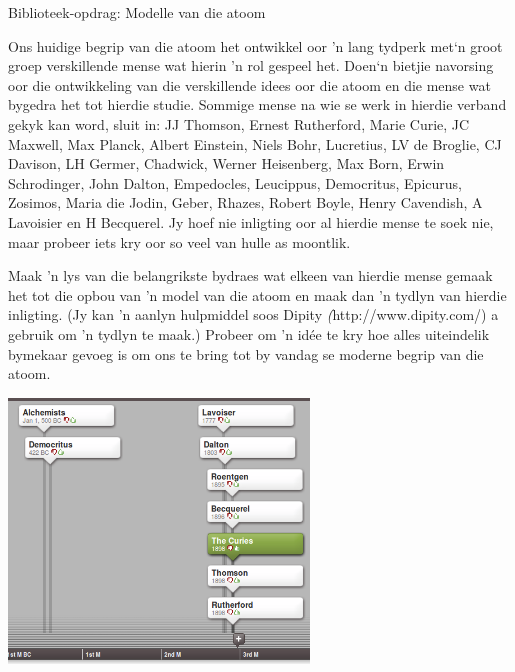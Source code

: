             \begin{project}{Biblioteek-opdrag: Modelle van die atoom}
            \nopagebreak
            \label{m38756*eip-3}

Ons huidige begrip van die atoom het ontwikkel oor 'n lang tydperk met‘n groot groep verskillende mense wat hierin 'n rol gespeel het. Doen‘n bietjie navorsing oor die ontwikkeling van die verskillende idees oor die atoom en die mense wat bygedra het tot hierdie studie. Sommige mense na wie se werk in hierdie verband gekyk kan word, sluit in: JJ Thomson, Ernest Rutherford, Marie Curie, JC Maxwell, Max Planck, Albert Einstein, Niels Bohr, Lucretius, LV de Broglie, CJ Davison, LH Germer, Chadwick, Werner Heisenberg, Max Born, Erwin Schrodinger, John Dalton, Empedocles, Leucippus,
Democritus, Epicurus, Zosimos, Maria die Jodin, Geber, Rhazes, Robert Boyle, Henry Cavendish, A Lavoisier en H Becquerel. Jy hoef nie inligting oor al hierdie mense te soek nie, maar probeer iets kry oor so veel van hulle as moontlik.
\par \begin{minipage}{.5\textwidth}
\label{m38756*id7342}Maak 'n lys van die belangrikste bydraes wat elkeen van hierdie mense gemaak het tot die opbou van 'n model van die atoom en maak dan 'n tydlyn van hierdie inligting. (Jy kan 'n aanlyn hulpmiddel soos Dipity \textsl(http://www.dipity.com/) a gebruik om 'n tydlyn te maak.) Probeer om 'n idée te kry hoe alles uiteindelik bymekaar gevoeg is om ons te bring tot by vandag se moderne begrip van die atoom.
\end{minipage}
\begin{minipage}{.5\textwidth}
 \begin{center}
  \includegraphics[width=0.6\textwidth]{photos/timeline_atom.png}
 \end{center}

\end{minipage}

\end{project}
\par \label{m38756*cid2}
